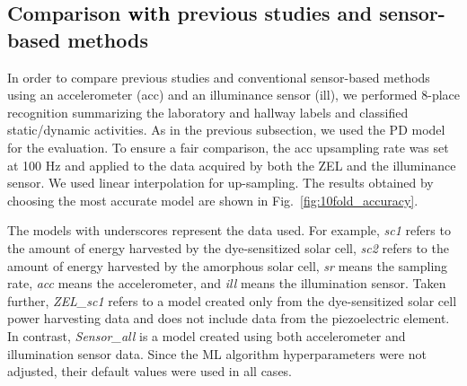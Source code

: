 \documentclass[conference]{IEEEtran}
\newcommand{\add}[1]{\textcolor{black}{#1}}	%
\newcommand{\erase}[1]{\if0{#1}\fi}	%
\begin{document}

\subsection{Comparison \erase{to} \add{with} previous studies and sensor-based methods}
In order to compare previous studies and conventional sensor-based methods using an accelerometer (acc) and an illuminance sensor (ill), we performed 8-place recognition summarizing the laboratory and hallway labels and classified static/dynamic activities.
As in the previous subsection, we used the PD model for the evaluation.
To ensure a fair comparison, the acc up\erase{-}sampling rate was set at 100 Hz and applied to the data acquired by both the ZEL and the illuminance sensor.
We used linear interpolation for up-sampling.
The results obtained by choosing the most accurate model are shown in Fig.~\ref{fig:10fold_accuracy}. 

The models with underscores represent the data used.
For example, \textit{sc1} refers to the amount of energy harvested by the dye-sensitized solar cell, \textit{sc2} refers to the amount of energy harvested by the amorphous solar cell, \textit{sr} means the sampling rate, \textit{acc} means the  accelerometer, and \textit{ill} means the illumination sensor.
Taken further, \textit{ZEL\_sc1} refers to a model created only from the dye-sensitized solar cell power harvesting data and does not include data from the piezoelectric element.
In contrast, \textit{Sensor\_all} is a model created using both accelerometer and illumination sensor data.
Since the ML algorithm hyperparameters were not adjusted, their default values were used in all cases. 
\end{document}
